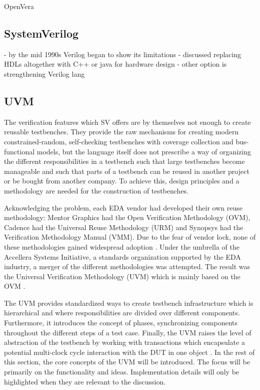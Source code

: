 \documentclass[12pt]{report}
\begin{document}
OpenVera \cite[Sec. 7, pp. 51-??]{flake2020a}

\subsection{SystemVerilog} %

\cite[Sec. 6, pp. 43]{flake2020a}
- by the mid 1990s Verilog began to show its limitations
- discussed replacing HDLs altogether with C++ or java for hardware design
- other option is strengthening Verilog lang

\subsection{UVM} %

The verification features which SV offers are by themselves not enough to create reusable testbenches. They provide
the raw mechanisms for creating modern constrained-random, self-checking testbenches with coverage collection and
bus-functional models, but the language itself does not prescribe a way of organizing the different responsibilities
in a testbench such that large testbenches become manageable and such that parts of a testbench can be reused in
another project or be bought from another company. To achieve this, design principles and a methodology are needed for
the construction of testbenches.

Acknowledging the problem, each EDA vendor had developed their own reuse methodology: Mentor Graphics had the Open
Verification Methodology (OVM), Cadence had the Universal Reuse Methodology (URM) and Synopsys had the Verification
Methodology Manual (VMM). Due to the fear of vendor lock, none of these methodologies gained widespread adoption
\cite[ch. 4.1]{mehta2018asic}. Under the umbrella of the Accellera Systems Initiative, a standards organization
supported by the EDA industry, a merger of the different methodologies was attempted. The result was the Universal
Verification Methodology (UVM) which is mainly based on the OVM \cite[ch. 4.1]{mehta2018asic}.

The UVM provides standardized ways to create testbench infrastructure which is hierarchical and where
responsibilities are divided over different components. Furthermore, it introduces the concept of phases,
synchronizing components throughout the different steps of a test case. Finally, the UVM raises the level of
abstraction of the testbench by working with transactions which encapsulate a potential multi-clock cycle interaction
with the DUT in one object \cite[ch. 4.1]{mehta2018asic}. In the rest of this section, the core concepts of the UVM
will be introduced. The focus will be primarily on the functionality and ideas. Implementation details will only be
highlighted when they are relevant to the discussion.
\end{document}

